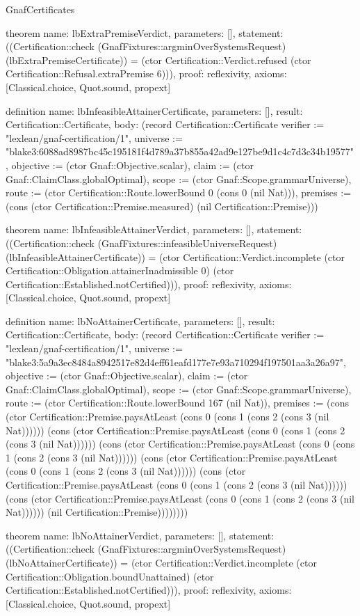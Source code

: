 \begin{lexlean}{GnafCertificates}
\begin{semanticmodule}
theorem{
  name: lbExtraPremiseVerdict,
  parameters: [],
  statement: ((Certification::check (GnafFixtures::argminOverSystemsRequest) (lbExtraPremiseCertificate)) = (ctor Certification::Verdict.refused (ctor Certification::Refusal.extraPremise 6))),
  proof: reflexivity{},
  axioms: [Classical.choice, Quot.sound, propext]
}

definition{
  name: lbInfeasibleAttainerCertificate,
  parameters: [],
  result: Certification::Certificate,
  body: (record Certification::Certificate {verifier := "lexlean/gnaf-certification/1", universe := "blake3:6088ad8987bc45c195181f4d789a37b855a42ad9e127be9d1c4c7d3c34b19577", objective := (ctor Gnaf::Objective.scalar), claim := (ctor Gnaf::ClaimClass.globalOptimal), scope := (ctor Gnaf::Scope.grammarUniverse), route := (ctor Certification::Route.lowerBound 0 (cons 0 (nil Nat))), premises := (cons (ctor Certification::Premise.measured) (nil Certification::Premise))})
}

theorem{
  name: lbInfeasibleAttainerVerdict,
  parameters: [],
  statement: ((Certification::check (GnafFixtures::infeasibleUniverseRequest) (lbInfeasibleAttainerCertificate)) = (ctor Certification::Verdict.incomplete (ctor Certification::Obligation.attainerInadmissible 0) (ctor Certification::Established.notCertified))),
  proof: reflexivity{},
  axioms: [Classical.choice, Quot.sound, propext]
}

definition{
  name: lbNoAttainerCertificate,
  parameters: [],
  result: Certification::Certificate,
  body: (record Certification::Certificate {verifier := "lexlean/gnaf-certification/1", universe := "blake3:5a9a3ec8484a8942517e82d4eff61eafd177e7e93a710294f197501aa3a26a97", objective := (ctor Gnaf::Objective.scalar), claim := (ctor Gnaf::ClaimClass.globalOptimal), scope := (ctor Gnaf::Scope.grammarUniverse), route := (ctor Certification::Route.lowerBound 167 (nil Nat)), premises := (cons (ctor Certification::Premise.paysAtLeast (cons 0 (cons 1 (cons 2 (cons 3 (nil Nat)))))) (cons (ctor Certification::Premise.paysAtLeast (cons 0 (cons 1 (cons 2 (cons 3 (nil Nat)))))) (cons (ctor Certification::Premise.paysAtLeast (cons 0 (cons 1 (cons 2 (cons 3 (nil Nat)))))) (cons (ctor Certification::Premise.paysAtLeast (cons 0 (cons 1 (cons 2 (cons 3 (nil Nat)))))) (cons (ctor Certification::Premise.paysAtLeast (cons 0 (cons 1 (cons 2 (cons 3 (nil Nat)))))) (cons (ctor Certification::Premise.paysAtLeast (cons 0 (cons 1 (cons 2 (cons 3 (nil Nat)))))) (nil Certification::Premise)))))))})
}

theorem{
  name: lbNoAttainerVerdict,
  parameters: [],
  statement: ((Certification::check (GnafFixtures::argminOverSystemsRequest) (lbNoAttainerCertificate)) = (ctor Certification::Verdict.incomplete (ctor Certification::Obligation.boundUnattained) (ctor Certification::Established.notCertified))),
  proof: reflexivity{},
  axioms: [Classical.choice, Quot.sound, propext]
}


\end{semanticmodule}
\end{lexlean}
